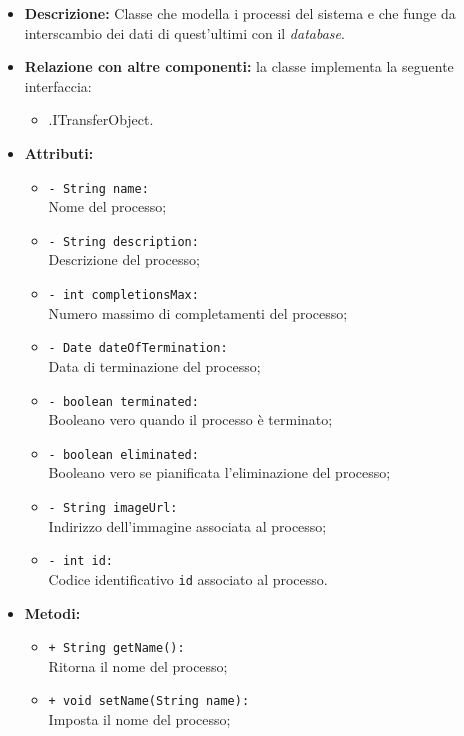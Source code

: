 \begin{flushleft}
\begin{itemize}
\item \textbf{Descrizione:} Classe che modella i processi del sistema e che funge da interscambio dei dati di quest'ultimi con il \textit{database}.
\item \textbf{Relazione con altre componenti:} la classe implementa la seguente interfaccia:
		\begin{itemize}
			\item \smodel{}.ITransferObject.
		\end{itemize}
\item \textbf{Attributi:}
\begin{sloppypar}
\begin{itemize}
\item \texttt{- String name:}\\ Nome del processo;
\item \texttt{- String description:}\\ Descrizione del processo;
\item \texttt{- int completionsMax:}\\ Numero massimo di completamenti del processo;
\item \texttt{- Date dateOfTermination:}\\ Data di terminazione del processo;
\item \texttt{- boolean terminated:}\\ Booleano vero quando il processo è terminato;
\item \texttt{- boolean eliminated:}\\ Booleano vero se pianificata l'eliminazione del processo;
\item \texttt{- String imageUrl:} \\Indirizzo dell'immagine associata al processo; 
\item \texttt{- int id:}\\ Codice identificativo \texttt{id} associato al processo.
\end{itemize}
\end{sloppypar}
\item \textbf{Metodi:}
\begin{sloppypar}
\begin{itemize}
\item \texttt{+ String getName():}\\ Ritorna il nome del processo;
\item \texttt{+ void setName(String name):}\\ Imposta il nome del processo;

\end{itemize}
\end{sloppypar}
\end{itemize}
\end{flushleft}
